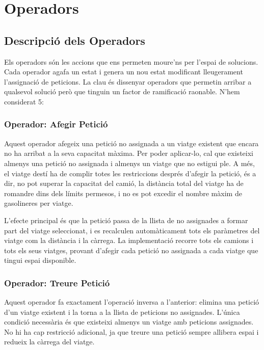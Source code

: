 \section{Operadors}
\label{sec:operadors}

\subsection{Descripció dels Operadors}

Els operadors són les accions que ens permeten moure'ns per l'espai de solucions. Cada operador agafa un estat i genera un nou estat modificant lleugerament l'assignació de peticions. La clau és dissenyar operadors que permetin arribar a qualsevol solució però que tinguin un factor de ramificació raonable. N'hem considerat 5:

\subsubsection{Operador: Afegir Petició}

Aquest operador afegeix una petició no assignada a un viatge existent que encara no ha arribat a la seva capacitat màxima. Per poder aplicar-lo, cal que existeixi almenys una petició no assignada i almenys un viatge que no estigui ple. A més, el viatge destí ha de complir totes les restriccions després d'afegir la petició, és a dir, no pot superar la capacitat del camió, la distància total del viatge ha de romandre dins dels límits permesos, i no es pot excedir el nombre màxim de gasolineres per viatge.

L'efecte principal és que la petició passa de la llista de no assignades a formar part del viatge seleccionat, i es recalculen automàticament tots els paràmetres del viatge com la distància i la càrrega. La implementació recorre tots els camions i tots els seus viatges, provant d'afegir cada petició no assignada a cada viatge que tingui espai disponible.

\subsubsection{Operador: Treure Petició}

Aquest operador fa exactament l'operació inversa a l'anterior: elimina una petició d'un viatge existent i la torna a la llista de peticions no assignades. L'única condició necessària és que existeixi almenys un viatge amb peticions assignades. No hi ha cap restricció adicional, ja que treure una petició sempre allibera espai i redueix la càrrega del viatge.

